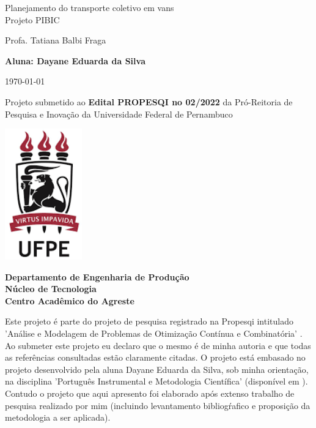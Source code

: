 \documentclass[11pt,a4paper]{article}
\newcommand{\titlestr}{Planejamento do transporte coletivo em vans \\ Projeto PIBIC}
\newcommand{\authorstr}{Profa. Tatiana Balbi Fraga} %
\begin{document}
\begin{titlepage}
  \centering
  
  {\LARGE \titlestr \par}

  \vspace{1cm}
  {\Large \authorstr \par}

  {\bf Aluna: Dayane Eduarda da Silva}

  \vspace{1cm}
  \today     %

  \vspace{1.5cm}
  Projeto submetido ao
  {\bf Edital PROPESQI no 02/2022}
  da Pró-Reitoria de Pesquisa e Inovação
  da Universidade Federal de Pernambuco

  \includegraphics[width=0.25\textwidth]{logos/ufpe_logo.png}

  \vspace{2cm}
  \flushleft
  {\bf Departamento de Engenharia de Produção} \\
  {\bf Núcleo de Tecnologia} \\
  {\bf Centro Acadêmico do Agreste} \\

  \vspace{5mm} {\footnotesize Este projeto é parte do projeto de pesquisa registrado na Propesqi intitulado 'Análise e Modelagem de Problemas de Otimização Contínua e Combinatória' \citep{Fraga2021}. Ao submeter este projeto eu declaro que o mesmo é de minha autoria e que todas as referências consultadas estão claramente citadas. O projeto está embasado no projeto desenvolvido pela aluna Dayane Eduarda da Silva, sob minha orientação, na disciplina 'Português Instrumental e Metodologia Científica' (disponível em ). Contudo o projeto que aqui apresento foi elaborado após extenso trabalho de pesquisa realizado por mim (incluindo levantamento bibliogŕafico e proposição da metodologia a ser aplicada).\par}
    

\end{titlepage}
\end{document}
